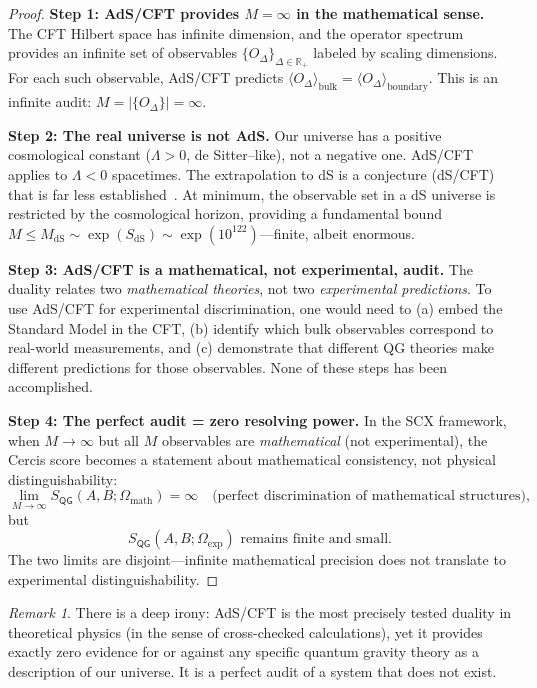\documentclass[12pt,a4paper]{article}
\newcommand{\braket}[1]{\langle #1 \rangle}
\theoremstyle{remark}
\newtheorem{remark}[theorem]{Remark}
\newcommand{\R}{\mathbb{R}}
\newcommand{\Cercis}{\textsf{Cercis}}
\newcommand{\QG}{\textsf{QG}}
\begin{document}
\begin{proof}
\noindent\textbf{Step 1: AdS/CFT provides $M = \infty$ in the mathematical sense.}
The CFT Hilbert space has infinite dimension, and the operator spectrum provides an infinite set of observables $\{O_{\Delta}\}_{\Delta \in \R_+}$ labeled by scaling dimensions. For each such observable, AdS/CFT predicts $\braket{O_{\Delta}}_{\text{bulk}} = \braket{O_{\Delta}}_{\text{boundary}}$. This is an infinite audit: $M = |\{O_{\Delta}\}| = \infty$.

\smallskip
\noindent\textbf{Step 2: The real universe is not AdS.}
Our universe has a positive cosmological constant ($\Lambda > 0$, de Sitter--like), not a negative one. AdS/CFT applies to $\Lambda < 0$ spacetimes. The extrapolation to dS is a conjecture (dS/CFT) that is far less established~\cite{strominger2001ds}. At minimum, the observable set in a dS universe is restricted by the cosmological horizon, providing a fundamental bound $M \leq M_{\text{dS}} \sim \exp(S_{\text{dS}}) \sim \exp(10^{122})$---finite, albeit enormous.

\smallskip
\noindent\textbf{Step 3: AdS/CFT is a mathematical, not experimental, audit.}
The duality relates two \emph{mathematical theories}, not two \emph{experimental predictions}. To use AdS/CFT for experimental discrimination, one would need to (a) embed the Standard Model in the CFT, (b) identify which bulk observables correspond to real-world measurements, and (c) demonstrate that different QG theories make different predictions for those observables. None of these steps has been accomplished.

\smallskip
\noindent\textbf{Step 4: The perfect audit = zero resolving power.}
In the SCX framework, when $M \to \infty$ but all $M$ observables are \emph{mathematical} (not experimental), the \Cercis{} score becomes a statement about mathematical consistency, not physical distinguishability:
\begin{equation}
  \lim_{M \to \infty} S_{\QG}(A, B; \Omega_{\text{math}}) = \infty \quad \text{(perfect discrimination of mathematical structures)},
\end{equation}
but
\begin{equation}
  S_{\QG}(A, B; \Omega_{\text{exp}}) \text{ remains finite and small}.
\end{equation}
The two limits are disjoint---infinite mathematical precision does not translate to experimental distinguishability.
\end{proof}

\begin{remark}
\label{rem:adscft_irony}
There is a deep irony: AdS/CFT is the most precisely tested duality in theoretical physics (in the sense of cross-checked calculations), yet it provides exactly zero evidence for or against any specific quantum gravity theory as a description of our universe. It is a perfect audit of a system that does not exist.
\end{remark}
\end{document}
